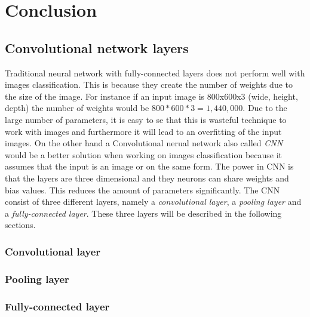 \chapter{Conclusion}
\label{chp:conc}

\section{Convolutional network layers}

Traditional neural network with fully-connected layers does not perform well with images classification. This is because they create the number of weights due to the size of the image. For instance if an input image is 800x600x3 (wide, height, depth) the number of weights would be $800 * 600 * 3 = 1,440,000$. Due to the large number of parameters, it is easy to se that this is wasteful technique to work with images and furthermore it will lead to an overfitting of the input images. On the other hand a
Convolutional nerual network also called \emph{CNN} would be a better solution when working on images classification because it assumes that the input is an image or on the same form. The power in CNN is that the layers are three dimensional and they neurons can share weights and bias values. This reduces the amount of parameters significantly. The CNN consist of three different layers, namely a \emph{convolutional layer}, a \emph{pooling layer} and a \emph{fully-connected layer}. These three layers will be described in the following sections.
 
\subsection{Convolutional layer}

\subsection{Pooling layer}

\subsection{Fully-connected layer}